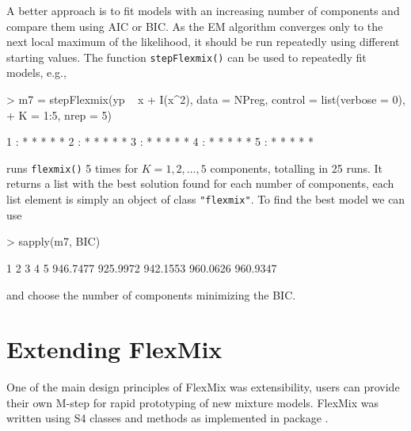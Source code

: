 \documentclass{jss}
\newcommand{\R}{\proglang{R}}
\begin{document}
A better approach is to fit models with an increasing number of
components and compare them using AIC or BIC. As the EM algorithm
converges only to the next local maximum of the likelihood, it should
be run repeatedly using different starting values. The function
\texttt{stepFlexmix()} can be used to repeatedly fit models, e.g.,
\begin{Schunk}
\begin{Sinput}
> m7 = stepFlexmix(yp ~ x + I(x^2), data = NPreg, control = list(verbose = 0), 
+     K = 1:5, nrep = 5)
\end{Sinput}
\begin{Soutput}
1 : * * * * *
2 : * * * * *
3 : * * * * *
4 : * * * * *
5 : * * * * *
\end{Soutput}
\end{Schunk}
runs \texttt{flexmix()} 5 times for $K=1,2,\ldots,5$ components,
totalling in 25 runs. It returns a list with the best solution found
for each number of components, each list element is simply an object
of class \texttt{"flexmix"}. To find the best model we can use
\begin{Schunk}
\begin{Sinput}
> sapply(m7, BIC)
\end{Sinput}
\begin{Soutput}
       1        2        3        4        5 
946.7477 925.9972 942.1553 960.0626 960.9347 
\end{Soutput}
\end{Schunk}
and choose the number of components minimizing the BIC.




\section{Extending FlexMix}
\label{sec:extending-flexmix}

One of the main design principles of FlexMix was extensibility, users
can provide their own M-step for rapid prototyping of new mixture
models. FlexMix was written using S4 classes and methods
\citep{flb:Chambers:1998} as implemented in \R{} package
. 
\end{document}
